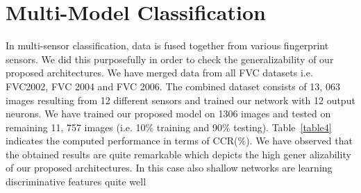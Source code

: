 \section{Multi-Model Classification}
		In multi-sensor classification, data is fused together from various fingerprint sensors. We did this purposefully in order to check the generalizability of our proposed architectures. We have merged data from all FVC datasets i.e. FVC2002, FVC 2004 and FVC 2006. The combined dataset consists of 13, 063 images resulting from 12 different sensors and trained our network with 12 output neurons. We have trained our proposed model on 1306 images and tested on remaining 11, 757 images (i.e. 10\% training and 90\% testing). Table~\ref{table4} indicates the computed performance in terms of CCR(\%). We have observed that the obtained results are quite remarkable which depicts the high gener alizability of our proposed architectures. In this case also shallow networks are learning discriminative features quite well

